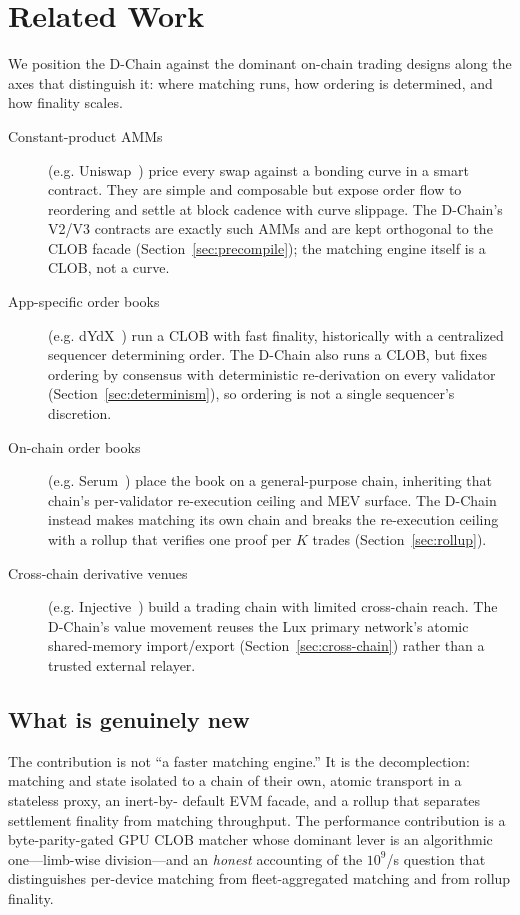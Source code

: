 \section{Related Work}
\label{sec:related}

We position the D-Chain against the dominant on-chain trading designs along the axes that
distinguish it: where matching runs, how ordering is determined, and how finality scales.

\begin{description}
  \item[Constant-product AMMs] (e.g. Uniswap~\cite{adams2020}) price every swap against a
  bonding curve in a smart contract. They are simple and composable but expose order flow to
  reordering and settle at block cadence with curve slippage. The D-Chain's V2/V3 contracts
  are exactly such AMMs and are kept orthogonal to the CLOB facade
  (Section~\ref{sec:precompile}); the matching engine itself is a CLOB, not a curve.
  \item[App-specific order books] (e.g. dYdX~\cite{dydx2021}) run a CLOB with fast finality,
  historically with a centralized sequencer determining order. The D-Chain also runs a CLOB,
  but fixes ordering by consensus with deterministic re-derivation on every validator
  (Section~\ref{sec:determinism}), so ordering is not a single sequencer's discretion.
  \item[On-chain order books] (e.g. Serum~\cite{serum2020}) place the book on a general-purpose
  chain, inheriting that chain's per-validator re-execution ceiling and MEV surface. The
  D-Chain instead makes matching its own chain and breaks the re-execution ceiling with a
  rollup that verifies one proof per $K$ trades (Section~\ref{sec:rollup}).
  \item[Cross-chain derivative venues] (e.g. Injective~\cite{injective2021}) build a trading
  chain with limited cross-chain reach. The D-Chain's value movement reuses the Lux primary
  network's atomic shared-memory import/export (Section~\ref{sec:cross-chain}) rather than a
  trusted external relayer.
\end{description}

\subsection{What is genuinely new}

The contribution is not ``a faster matching engine.'' It is the decomplection: matching and
state isolated to a chain of their own, atomic transport in a stateless proxy, an inert-by-
default EVM facade, and a rollup that separates settlement finality from matching throughput.
The performance contribution is a byte-parity-gated GPU CLOB matcher whose dominant lever is
an algorithmic one---limb-wise division---and an \emph{honest} accounting of the
$10^{9}$/s question that distinguishes per-device matching from fleet-aggregated matching and
from rollup finality.
